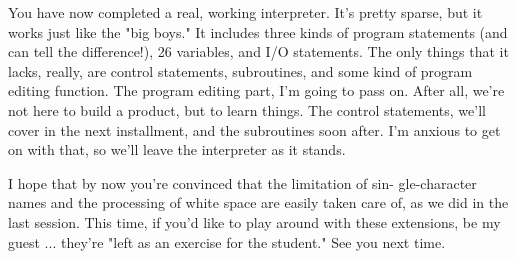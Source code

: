 \documentclass[float=false, crop=false]{standalone}
\begin{document}
You have now completed a real, working interpreter. It's pretty sparse, but it
works just like the "big boys." It includes three kinds of program statements
(and can tell the difference!), 26 variables, and I/O statements. The only
things that it lacks, really, are control statements, subroutines, and some kind
of program editing function. The program editing part, I'm going to pass on.
After all, we're not here to build a product, but to learn things. The control
statements, we'll cover in the next installment, and the subroutines soon after.
I'm anxious to get on with that, so we'll leave the interpreter as it stands.

I hope that by now you're convinced that the limitation of sin- gle-character
names and the processing of white space are easily taken care of, as we did in
the last session. This time, if you'd like to play around with these extensions,
be my guest ... they're "left as an exercise for the student." See you next
time.
\end{document}
